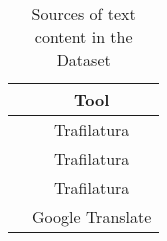 \begin{table}%
    \centering
    \begin{tabular}{c|c}
       \textbf{\contentType{}}  & \textbf{Tool} \\ \hline
       \trafilaturaTitle{}  & Trafilatura \\
       \trafilaturaAbstract{}  & Trafilatura \\
       \trafilaturaFulltext{}  & Trafilatura \\
       \translationTitle{}  & Google Translate \\
    \end{tabular}
    \caption{Sources of text content in the \VSI{} Dataset}
    \label{tab:04_pesv_sources of content}
\end{table}
